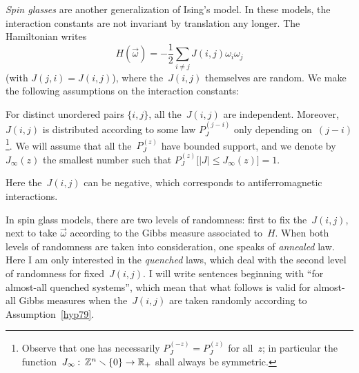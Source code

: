\emph{Spin glasses} are another generalization of Ising's model.
In these models, the interaction constants are not invariant by translation any longer.
The Hamiltonian writes
\[ H(\vec\omega) = - \frac{1}{2} \sum_{i\neq j} J(i,j) \omega_i\omega_j \]
(with $J(j,i) = J(i,j)$), where the~$J(i,j)$ themselves are random.
We make the following assumptions on the interaction constants:
%
\begin{Hyp}\label{hyp79}
For distinct unordered pairs $\{i,j\}$, all the~$J(i,j)$ are independent.
Moreover, $J(i,j)$ is distributed according to some law $P_J^{(j-i)}$ only depending on~$(j-i)$%
\footnote{Observe that one has necessarily $P_J^{(-z)} = P_J^{(z)}$ for all~$z$;
in particular the function~${J_\infty \colon} \ab {\ZZ^n \setminus \{0\}} \to \RR_+$
shall always be symmetric.}.
We will assume that all the~$P_J^{(z)}$ have bounded support,
and we denote by~$J_\infty(z)$ the smallest number such that
$P_J^{(z)} \big[ |J| \leq J_\infty(z) \big] = 1$.
\end{Hyp}

\begin{Rmk}
Here the~$J(i,j)$ can be negative, which corresponds to antiferromagnetic interactions.
\end{Rmk}

\begin{NOTA}
In spin glass models, there are two levels of randomness: first to fix the~$J(i,j)$,
next to take $\vec\omega$ according to the Gibbs measure associated to~$H$.
When both levels of randomness are taken into consideration, one speaks of \emph{annealed} law.
Here I am only interested in the \emph{quenched} laws,
which deal with the second level of randomness for fixed~$J(i,j)$.
I will write sentences beginning with ``for almost-all quenched systems'',
which mean that what follows is valid for almost-all Gibbs measures
when the~$J(i,j)$ are taken randomly according to Assumption~\ref{hyp79}.
\end{NOTA}

